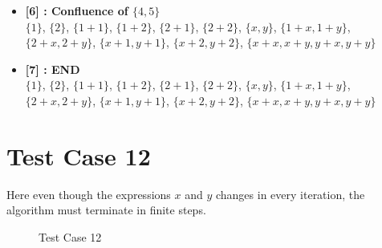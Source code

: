 \begin{itemize}
    \item \textbf{[6] : Confluence of $\{4, 5\}$}\\
        $\{1\}$, $\{2\}$, $\{1 + 1\}$, $\{1 + 2\}$, $\{2 + 1\}$, $\{2 + 2\}$, $\{x, y\}$, $\{1 + x, 1 + y\}$, $\{2 + x, 2 + y\}$, $\{x + 1, y + 1\}$, $\{x + 2, y + 2\}$, $\{x + x, x + y, y + x, y + y\}$

    \item \textbf{[7] : END}\\
        $\{1\}$, $\{2\}$, $\{1 + 1\}$, $\{1 + 2\}$, $\{2 + 1\}$, $\{2 + 2\}$, $\{x, y\}$, $\{1 + x, 1 + y\}$, $\{2 + x, 2 + y\}$, $\{x + 1, y + 1\}$, $\{x + 2, y + 2\}$, $\{x + x, x + y, y + x, y + y\}$

\end{itemize}

\section{Test Case 12}
\label{sec:tc12}
Here even though the expressions $x$ and $y$ changes in every iteration, the 
algorithm must terminate in finite steps.

\begin{figure}[H]
\label{fig:tc12}
    \caption{Test Case 12}
\end{figure}

